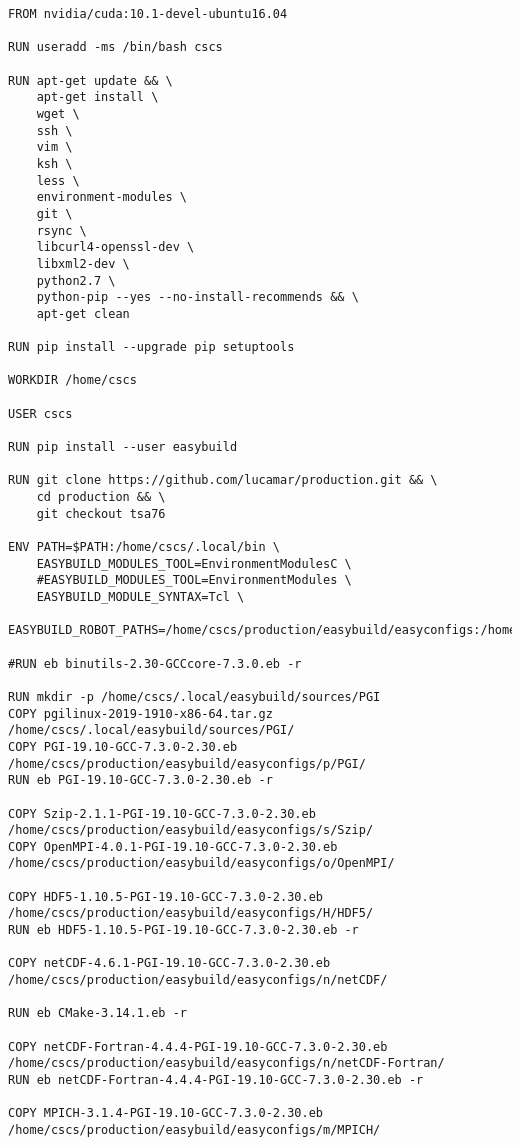 \documentclass{article}
\begin{document}
\footnotesize
\begin{verbatim}
FROM nvidia/cuda:10.1-devel-ubuntu16.04

RUN useradd -ms /bin/bash cscs

RUN apt-get update && \
    apt-get install \
    wget \
    ssh \
    vim \
    ksh \
    less \
    environment-modules \
    git \
    rsync \
    libcurl4-openssl-dev \
    libxml2-dev \
    python2.7 \
    python-pip --yes --no-install-recommends && \
    apt-get clean

RUN pip install --upgrade pip setuptools

WORKDIR /home/cscs

USER cscs

RUN pip install --user easybuild

RUN git clone https://github.com/lucamar/production.git && \
    cd production && \
    git checkout tsa76

ENV PATH=$PATH:/home/cscs/.local/bin \
    EASYBUILD_MODULES_TOOL=EnvironmentModulesC \
    #EASYBUILD_MODULES_TOOL=EnvironmentModules \
    EASYBUILD_MODULE_SYNTAX=Tcl \
    EASYBUILD_ROBOT_PATHS=/home/cscs/production/easybuild/easyconfigs:/home/cscs/.local/easybuild/easyconfigs

#RUN eb binutils-2.30-GCCcore-7.3.0.eb -r

RUN mkdir -p /home/cscs/.local/easybuild/sources/PGI
COPY pgilinux-2019-1910-x86-64.tar.gz /home/cscs/.local/easybuild/sources/PGI/
COPY PGI-19.10-GCC-7.3.0-2.30.eb /home/cscs/production/easybuild/easyconfigs/p/PGI/
RUN eb PGI-19.10-GCC-7.3.0-2.30.eb -r

COPY Szip-2.1.1-PGI-19.10-GCC-7.3.0-2.30.eb /home/cscs/production/easybuild/easyconfigs/s/Szip/
COPY OpenMPI-4.0.1-PGI-19.10-GCC-7.3.0-2.30.eb /home/cscs/production/easybuild/easyconfigs/o/OpenMPI/

COPY HDF5-1.10.5-PGI-19.10-GCC-7.3.0-2.30.eb /home/cscs/production/easybuild/easyconfigs/H/HDF5/
RUN eb HDF5-1.10.5-PGI-19.10-GCC-7.3.0-2.30.eb -r

COPY netCDF-4.6.1-PGI-19.10-GCC-7.3.0-2.30.eb /home/cscs/production/easybuild/easyconfigs/n/netCDF/

RUN eb CMake-3.14.1.eb -r

COPY netCDF-Fortran-4.4.4-PGI-19.10-GCC-7.3.0-2.30.eb /home/cscs/production/easybuild/easyconfigs/n/netCDF-Fortran/
RUN eb netCDF-Fortran-4.4.4-PGI-19.10-GCC-7.3.0-2.30.eb -r

COPY MPICH-3.1.4-PGI-19.10-GCC-7.3.0-2.30.eb /home/cscs/production/easybuild/easyconfigs/m/MPICH/


\end{verbatim}
\end{document}
